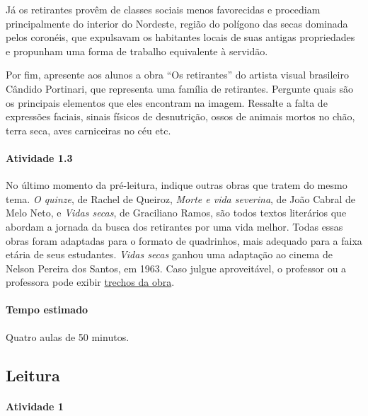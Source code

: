 \documentclass[11pt]{extarticle}
\begin{document}
Já os retirantes provêm de classes sociais menos favorecidas e procediam principalmente do interior do 
Nordeste, região do polígono das secas dominada pelos coronéis, que expulsavam os habitantes locais de suas antigas
propriedades e propunham uma forma de trabalho equivalente à servidão. 

Por fim, apresente aos alunos a obra ``Os retirantes'' do artista visual brasileiro Cândido Portinari,
que representa uma família de retirantes. Pergunte quais são os principais elementos que eles encontram
na imagem. Ressalte a falta de expressões faciais, sinais físicos de desnutrição, ossos de animais mortos
no chão, terra seca, aves carniceiras no céu etc.



\paragraph{Atividade 1.3}

No último momento da pré-leitura, indique outras obras que tratem do mesmo tema. 
\textit{O quinze}, de Rachel de Queiroz, \textit{Morte e vida severina}, de João Cabral de Melo Neto, 
e \textit{Vidas secas}, de Graciliano Ramos, são todos textos literários que abordam 
a jornada da busca dos retirantes por uma vida melhor. Todas essas obras foram adaptadas para o formato de quadrinhos, mais adequado para a faixa etária de seus estudantes. \textit{Vidas secas} ganhou uma adaptação ao cinema 
de Nelson Pereira dos Santos, em 1963. Caso julgue aproveitável, o professor ou a professora
pode exibir \href{https://www.youtube.com/watch?v=m5fsDcFOdwQ&t=9s}{trechos da obra}.

\paragraph{Tempo estimado} Quatro aulas de 50 minutos. 

\subsection{Leitura}


\paragraph{Atividade 1}
\end{document}
